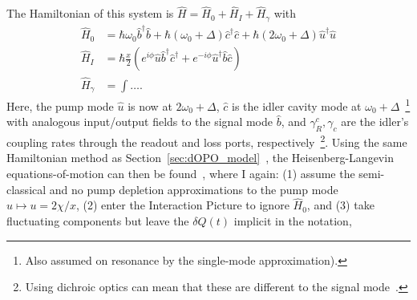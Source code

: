 The Hamiltonian of this system is $\hat H = \hat H_0+\hat H_I+\hat H_\gamma$ with~\cite{}
\begin{align}
\hat H_0 &= \hbar \omega_0 \hat b^\dag \hat b + \hbar (\omega_0+\Delta) \hat c^\dag \hat c + \hbar (2\omega_0+\Delta) \hat u^\dag \hat u\\
\hat H_I &= \hbar \frac{x}{2} \left(e^{i\phi} \hat u \hat b^\dag \hat c^\dag + e^{-i\phi} \hat u^\dag \hat b \hat c \right)\\
\hat H_\gamma &= \int \ldots .
\end{align}
Here, the pump mode $\hat u$ is now at $2\omega_0+\Delta$, $\hat c$ is the idler cavity mode at $\omega_0+\Delta$~\footnote{Also assumed on resonance by the single-mode approximation).} with analogous input/output fields to the signal mode $\hat b$,
and $\gamma^c_R,\gamma_c$ are the idler's coupling rates through the readout and loss ports, respectively~\footnote{Using dichroic optics can mean that these are different to the signal mode~\cite{}.}. %
Using the same Hamiltonian method as Section~\ref{sec:dOPO_model}~\cite{}, the Heisenberg-Langevin equations-of-motion can then be found~\cite{}, where I again: (1) assume the semi-classical and no pump depletion approximations to the pump mode $\hat u\mapsto u=2\chi/x$, (2) enter the Interaction Picture to ignore $\hat H_0$, and (3) take fluctuating components but leave the $\delta \hat Q(t)$ implicit in the notation,
